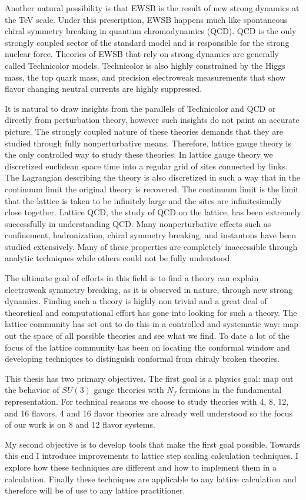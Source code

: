 Another natural possibility is that EWSB is the result of new strong dynamics at the TeV scale.
Under this prescription, EWSB happens much like spontaneous chiral symmetry breaking in quantum chromodynamics (QCD).
QCD is the only strongly coupled sector of the standard model and is responsible for the strong nuclear force.
Theories of EWSB that rely on strong dynamics are generally called Technicolor models.
Technicolor is also highly constrained by the Higgs mass, the top quark mass, and precision electroweak measurements that show flavor changing neutral currents are highly suppressed.

It is natural to draw insights from the parallels of Technicolor and QCD or directly from perturbation theory, however such insights do not paint an accurate picture.
The strongly coupled nature of these theories demands that they are studied through fully nonperturbative means.
Therefore, lattice gauge theory is the only controlled way to study these theories.
In lattice gauge theory we discretized euclidean space time into a regular grid of sites connected by links.
The Lagrangian describing the theory is also discretized in such a way that in the continuum limit the original theory is recovered.
The continuum limit is the limit that the lattice is taken to be infinitely large and the sites are infinitesimally close together.
Lattice QCD, the study of QCD on the lattice, has been extremely successfully in understanding QCD.
Many nonperturbative effects such as confinement, hadronization, chiral symmetry breaking, and instantons have been studied extensively.
Many of these properties are completely inaccessible through analytic techniques while others could not be fully understood.

The ultimate goal of efforts in this field is to find a theory can explain electroweak symmetry breaking, as it is observed in nature, through new strong dynamics.
Finding such a theory is highly non trivial and a great deal of theoretical and computational effort has gone into looking for such a theory.
The lattice community has set out to do this in a controlled and systematic way: map out the space of all possible theories and see what we find.
To date a lot of the focus of the lattice community has been on locating the conformal window and developing techniques to distinguish conformal from chiraly broken theories.

This thesis has two primary objectives.
The first goal is a physics goal:  map out the behavior of $SU(3)$ gauge theories with $N_f$ fermions in the fundamental representation.
For technical reasons we choose to study theories with 4, 8, 12, and 16 flavors.
4 and 16 flavor theories are already well understood so the focus of our work is on 8 and 12 flavor systems.

My second objective is to develop tools that make the first goal possible.
Towards this end I introduce improvements to lattice step scaling calculation techniques.
I explore how these techniques are different and how to implement them in a calculation.
Finally these techniques are applicable to any lattice calculation and therefore will be of use to any lattice practitioner.
